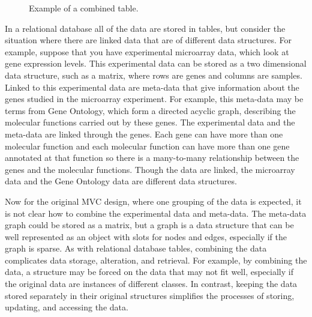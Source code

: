 \documentclass{article}[11pt]
\begin{document}
\begin{figure}[ht]
  \begin{center}
    \caption{ Example of a combined table. }
    \label{Fig:OneDBTab}
  \end{center}
\end{figure}

In a relational database all of the data are stored in tables, but consider the
situation where there are linked data that are of different data
structures.  For example, suppose that you have experimental microarray data,
which look at gene expression levels.  This experimental data can be
stored as a two dimensional data structure, such as a matrix, where rows are
genes and columns are samples.  Linked to this experimental data are meta-data
that give information about the genes studied in the microarray experiment.
For example, this meta-data may be terms from Gene Ontology, which form a
directed acyclic graph, describing the molecular functions carried out by
these genes.  The experimental data and the meta-data
are linked through the genes.  Each gene can have more than one molecular
function and each molecular function can have more than one gene annotated at
that function so there is a many-to-many relationship between the genes and
the molecular functions.  Though the data are linked, the
microarray data and the Gene Ontology data are different data structures.   

Now for the original MVC design, where one grouping of the data is expected,
it is not clear how to combine the experimental data and meta-data.  The
meta-data graph could be stored as a matrix, but a graph is a data structure
that can be well represented as an object with slots for nodes and edges,
especially if the graph is sparse.  As with relational database tables,
combining the data complicates data storage, alteration, and retrieval.  For
example, by combining the data, a structure may be forced on the data that may
not fit well, especially if the original data are instances of different
classes.  In contrast, keeping the data stored separately in their original
structures simplifies the processes of storing, updating, and accessing the
data.   
\end{document}
